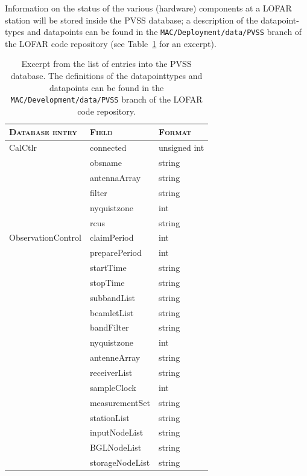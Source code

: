 \documentclass[a4paper,10pt,bibtotoc]{scrartcl}
\begin{document}
Information on the status of the various (hardware) components at a LOFAR station
will be stored inside the PVSS database; a description of the datapoint-types and
datapoints can be found in the \verb|MAC/Deployment/data/PVSS| branch of the
LOFAR code repository (see Table~\ref{tab:PVSS} for an excerpt).

\begin{table}[htb]
  \centering
  \begin{tabular}{|lll|}
    \hline
    \textsc{Database entry} & \textsc{Field} & \textsc{Format} \\
    \hline
    \hline
    CalCtlr & connected    & unsigned int \\
            & obsname      & string \\
            & antennaArray & string \\
            & filter       & string \\
            & nyquistzone  & int \\
            & rcus         & string \\
    \hline
    ObservationControl & claimPeriod & int \\
    & preparePeriod   & int \\
    & startTime       & string \\
    & stopTime        & string \\
    & subbandList     & string \\
    & beamletList     & string \\
    & bandFilter      & string \\
    & nyquistzone     & int \\
    & antenneArray    & string \\
    & receiverList    & string \\
    & sampleClock     & int \\
    & measurementSet  & string \\
    & stationList     & string \\
    & inputNodeList   & string \\
    & BGLNodeList     & string \\
    & storageNodeList & string \\
    \hline
  \end{tabular}
  \caption[Excerpt from the list of entries into the PVSS database.]{
    Excerpt from the list of entries into the PVSS database. The
    definitions of the datapointtypes and datapoints can be found in the
    \texttt{MAC/Development/data/PVSS} branch of the LOFAR code repository.}
  \label{tab:PVSS}
\end{table}
\end{document}
